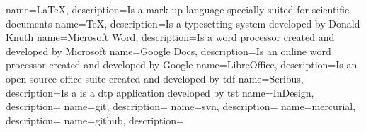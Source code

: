 {
    name=\LaTeX,
    description={Is a mark up language specially suited for scientific documents}
}
{
    name=\TeX,
    description={Is a typesetting system developed by Donald Knuth}
}
{
    name={Microsoft Word},
    description={Is a word processor created and developed by Microsoft}
}
{
    name={Google Docs},
    description={Is an online word processor created and developed by Google}
}
{
    name=LibreOffice,
    description={Is an open source office suite created and developed by \acrlong{tdf}}
}
{
    name=Scribus,
    description={Is a is a \acrlong{dtp} application developed by \acrlong{tst}}
}
{
    name=InDesign,
    description={}
}
{
    name=git,
    description={}
}
{
    name=svn,
    description={}
}
{
    name=mercurial,
    description={}
}
{
    name=github,
    description={}
}

